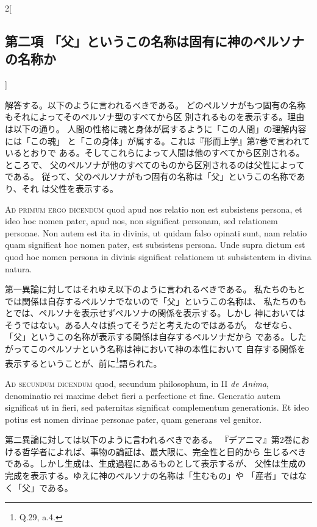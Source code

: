 \documentclass[paper=a4paper,fontsize=10pt,jafontsize=9pt,titlepage]{jlreq}
\begin{document}
\begin{paracol}{2}[\subsection{第二項 「父」というこの名称は固有に神のペルソナの名称か}]
\switchcolumn


解答する。以下のように言われるべきである。
どのペルソナがもつ固有の名称もそれによってそのペルソナ型のすべてから区
 別されるものを表示する。理由は以下の通り。
人間の性格に魂と身体が属するように「この人間」の理解内容には「この魂」
 と「この身体」が属する。これは『形而上学』第7巻で言われているとおりで
 ある。そしてこれらによって人間は他のすべてから区別される。ところで、
 父のペルソナが他のすべてのものから区別されるのは父性によってである。
従って、父のペルソナがもつ固有の名称は「父」というこの名称であり、それ
 は父性を表示する。


\switchcolumn*[\subsection{ad.1}]


{\scshape Ad primum ergo dicendum} quod apud nos relatio non est subsistens
persona, et ideo hoc nomen pater, apud nos, non significat personam,
sed relationem personae. Non autem est ita in divinis, ut quidam falso
opinati sunt, nam relatio quam significat hoc nomen pater, est
subsistens persona. Unde supra dictum est quod hoc nomen persona in
divinis significat relationem ut subsistentem in divina natura.


\switchcolumn


第一異論に対してはそれゆえ以下のように言われるべきである。
私たちのもとでは関係は自存するペルソナでないので「父」というこの名称は、
 私たちのもとでは、ペルソナを表示せずペルソナの関係を表示する。しかし
 神においてはそうではない。ある人々は誤ってそうだと考えたのではあるが。
 なぜなら、「父」というこの名称が表示する関係は自存するペルソナだから
 である。したがってこのペルソナという名称は神において神の本性において
 自存する関係を表示するということが、前に\footnote{Q.29, a.4.}語られた。


\switchcolumn*[\subsection{ad.2}]


{\scshape Ad secundum dicendum} quod, secundum philosophum, in II {\itshape de Anima},
denominatio rei maxime debet fieri a perfectione et fine. Generatio
autem significat ut in fieri, sed paternitas significat complementum
generationis. Et ideo potius est nomen divinae personae pater, quam
generans vel genitor.


\switchcolumn


第二異論に対しては以下のように言われるべきである。
『デアニマ』第2巻における哲学者によれば、事物の論証は、最大限に、完全性と目的から
 生じるべきである。しかし生成は、生成過程にあるものとして表示するが、
 父性は生成の完成を表示する。ゆえに神のペルソナの名称は「生むもの」や
 「産者」ではなく「父」である。



\end{paracol}
\end{document}
